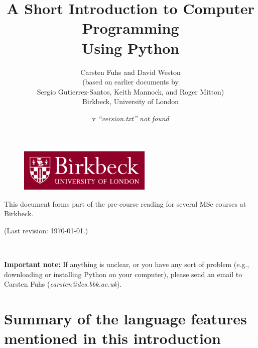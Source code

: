 \documentclass[11pt,a4paper]{article}
\title{A Short Introduction to Computer Programming\\
  Using Python}
\author{Carsten Fuhs and David Weston\\
  (based on earlier documents by\\
  Sergio Gutierrez-Santos, Keith Mannock, and Roger Mitton)\\
  Birkbeck, University of London}
\date{\InputIfFileExists{version.txt}
     {v}
     {\emph{``version.txt'' not found}}}
\begin{document}

\maketitle

\thispagestyle{empty}

\vfill 

\begin{figure}[h!]  %
  \centering
  \includegraphics[height=2cm]{Birkbeck-Logo-Colour-330x104.jpg}
\end{figure}

\vfill

\noindent This document forms part of the pre-course reading for
several MSc courses at Birkbeck.


\noindent (Last revision: \today.)


\newpage

~\vspace{8cm}

\textbf{Important note: } If anything is unclear, or you have any 
sort of problem (e.g.,
downloading or installing Python on your computer), please send an
email to Carsten Fuhs (\emph{carsten@dcs.bbk.ac.uk}).
\newpage


\newpage


\newpage


\newpage


\newpage


\newpage

\section{Summary of the language features mentioned in this introduction}
\label{sec:summ-lang-feat}

\newpage

% 
\end{document}
